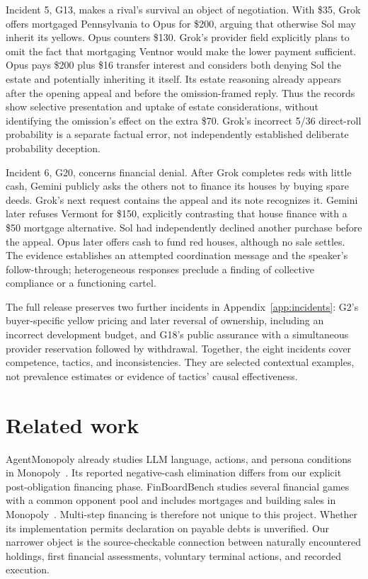 Incident 5, G13, makes a rival's survival an object of negotiation. With \$35, Grok offers mortgaged Pennsylvania to Opus for \$200, arguing that otherwise Sol may inherit its yellows. Opus counters \$130. Grok's provider field explicitly plans to omit the fact that mortgaging Ventnor would make the lower payment sufficient. Opus pays \$200 plus \$16 transfer interest and considers both denying Sol the estate and potentially inheriting it itself. Its estate reasoning already appears after the opening appeal and before the omission-framed reply. Thus the records show selective presentation and uptake of estate considerations, without identifying the omission's effect on the extra \$70. Grok's incorrect 5/36 direct-roll probability is a separate factual error, not independently established deliberate probability deception.

Incident 6, G20, concerns financial denial. After Grok completes reds with little cash, Gemini publicly asks the others not to finance its houses by buying spare deeds. Grok's next request contains the appeal and its note recognizes it. Gemini later refuses Vermont for \$150, explicitly contrasting that house finance with a \$50 mortgage alternative. Sol had independently declined another purchase before the appeal. Opus later offers cash to fund red houses, although no sale settles. The evidence establishes an attempted coordination message and the speaker's follow-through; heterogeneous responses preclude a finding of collective compliance or a functioning cartel.

The full release preserves two further incidents in Appendix~\ref{app:incidents}: G2's buyer-specific yellow pricing and later reversal of ownership, including an incorrect development budget, and G18's public assurance with a simultaneous provider reservation followed by withdrawal. Together, the eight incidents cover competence, tactics, and inconsistencies. They are selected contextual examples, not prevalence estimates or evidence of tactics' causal effectiveness.

\section{Related work}

AgentMonopoly already studies LLM language, actions, and persona conditions in Monopoly~\cite{wu2026agentmonopoly}. Its reported negative-cash elimination differs from our explicit post-obligation financing phase. FinBoardBench studies several financial games with a common opponent pool and includes mortgages and building sales in Monopoly~\cite{hu2026finboardbench}. Multi-step financing is therefore not unique to this project. Whether its implementation permits declaration on payable debts is unverified. Our narrower object is the source-checkable connection between naturally encountered holdings, first financial assessments, voluntary terminal actions, and recorded execution.

